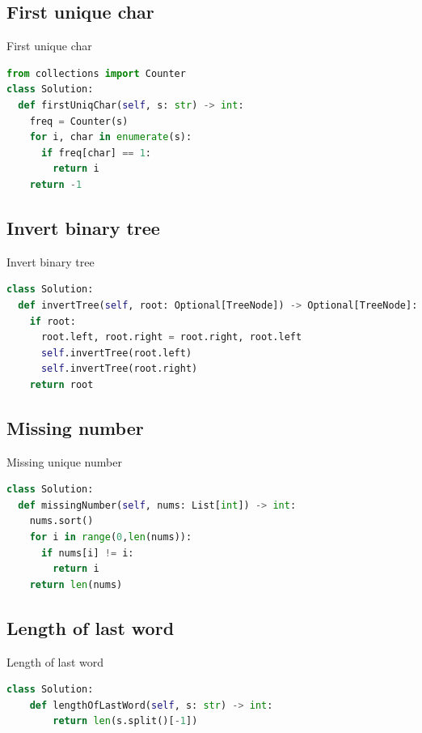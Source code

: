 \documentclass[a4paper,12pt]{article}
\begin{document}
\begin{multicols}{2}
\subsection{First unique char}

\begin{mycode}[label={lst:first-unique-char}]{First unique char}
\begin{lstlisting}[language=Python]
from collections import Counter
class Solution:
  def firstUniqChar(self, s: str) -> int:
    freq = Counter(s)
    for i, char in enumerate(s):
      if freq[char] == 1:
        return i
    return -1
\end{lstlisting}
\end{mycode}

\subsection{Invert binary tree}
\begin{mycode}[label={lst:invert-binary-tree}]{Invert binary tree}
\begin{lstlisting}[language=Python]
class Solution:
  def invertTree(self, root: Optional[TreeNode]) -> Optional[TreeNode]:
    if root:
      root.left, root.right = root.right, root.left
      self.invertTree(root.left)
      self.invertTree(root.right)
    return root
\end{lstlisting}
\end{mycode}

\subsection{Missing number}

\begin{mycode}[label={lst:missing-number}]{Missing unique number}
\begin{lstlisting}[language=Python]
class Solution:
  def missingNumber(self, nums: List[int]) -> int:
    nums.sort()
    for i in range(0,len(nums)):
      if nums[i] != i:
        return i
    return len(nums)
\end{lstlisting}
\end{mycode}

\subsection{Length of last word}

\begin{mycode}[label={lst:len-last-word}]{Length of last word}
\begin{lstlisting}[language=Python]
class Solution:
    def lengthOfLastWord(self, s: str) -> int:
        return len(s.split()[-1])
\end{lstlisting}
\end{mycode}


\end{multicols}
\end{document}
